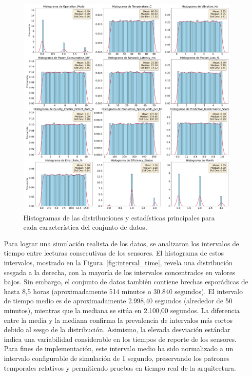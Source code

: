 \begin{figure}[ht!]
    \centering
    \includegraphics[width=\textwidth]{fig/08_datadriven/datadriven_03.pdf}
    \caption{Histogramas de las distribuciones y estadísticas principales para cada característica del conjunto de datos.}
    \label{fig:all_histograms_english}
\end{figure}

Para lograr una simulación realista de los datos, se analizaron los intervalos de tiempo entre lecturas consecutivas de los sensores. El histograma de estos intervalos, mostrado en la Figura~\ref{fig:interval_time}, revela una distribución sesgada a la derecha, con la mayoría de los intervalos concentrados en valores bajos. Sin embargo, el conjunto de datos también contiene brechas esporádicas de hasta 8,5 horas (aproximadamente 514 minutos o 30.840 segundos). El intervalo de tiempo medio es de aproximadamente 2.998,40 segundos (alrededor de 50 minutos), mientras que la mediana se sitúa en 2.100,00 segundos. La diferencia entre la media y la mediana confirma la prevalencia de intervalos más cortos debido al sesgo de la distribución. Asimismo, la elevada desviación estándar indica una variabilidad considerable en los tiempos de reporte de los sensores. Para fines de implementación, este intervalo medio ha sido normalizado a un intervalo configurable de simulación de 1 segundo, preservando los patrones temporales relativos y permitiendo pruebas en tiempo real de la arquitectura.


